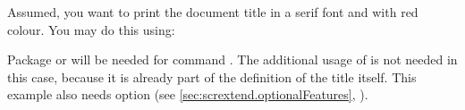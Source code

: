 \else
    \begin{Example}
      Assumed, you want to print the document title in a serif font and with
      red colour. You may do this using:
\begin{lstcode}
\end{lstcode}
      Package  or  will be needed for command
      . The additional usage of
       is not needed in this case, because it is already
      part of the definition of the title itself. This
      example also needs option
       (see
      \autoref{sec:scrextend.optionalFeatures}, 
      ).
    \end{Example}
  \else
